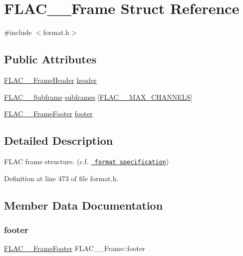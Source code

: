 \hypertarget{struct_f_l_a_c_____frame}{}\section{F\+L\+A\+C\+\_\+\+\_\+\+Frame Struct Reference}
\label{struct_f_l_a_c_____frame}


{\ttfamily \#include $<$format.\+h$>$}

\subsection*{Public Attributes}
\begin{DoxyCompactItemize}
\item 
\mbox{\hyperlink{struct_f_l_a_c_____frame_header}{F\+L\+A\+C\+\_\+\+\_\+\+Frame\+Header}} \mbox{\hyperlink{struct_f_l_a_c_____frame_ae39796592bb27512110976fe7b80ce06}{header}}
\item 
\mbox{\hyperlink{struct_f_l_a_c_____subframe}{F\+L\+A\+C\+\_\+\+\_\+\+Subframe}} \mbox{\hyperlink{struct_f_l_a_c_____frame_a526e3e6173e7a6db752e7a44bff3e91d}{subframes}} \mbox{[}\mbox{\hyperlink{group__flac__format_ga488aa5678a58d08f984f5d39185b763d}{F\+L\+A\+C\+\_\+\+\_\+\+M\+A\+X\+\_\+\+C\+H\+A\+N\+N\+E\+LS}}\mbox{]}
\item 
\mbox{\hyperlink{struct_f_l_a_c_____frame_footer}{F\+L\+A\+C\+\_\+\+\_\+\+Frame\+Footer}} \mbox{\hyperlink{struct_f_l_a_c_____frame_ae8862dd8210e49bda8179559891d2d4e}{footer}}
\end{DoxyCompactItemize}


\subsection{Detailed Description}
F\+L\+AC frame structure. (c.\+f. \href{../format.html\#frame}{\texttt{ format specification}}) 

Definition at line 473 of file format.\+h.



\subsection{Member Data Documentation}
\mbox{\label{struct_f_l_a_c_____frame_ae8862dd8210e49bda8179559891d2d4e}} 
\subsubsection{\texorpdfstring{footer}{footer}}
{\footnotesize\ttfamily \mbox{\hyperlink{struct_f_l_a_c_____frame_footer}{F\+L\+A\+C\+\_\+\+\_\+\+Frame\+Footer}} F\+L\+A\+C\+\_\+\+\_\+\+Frame\+::footer}



